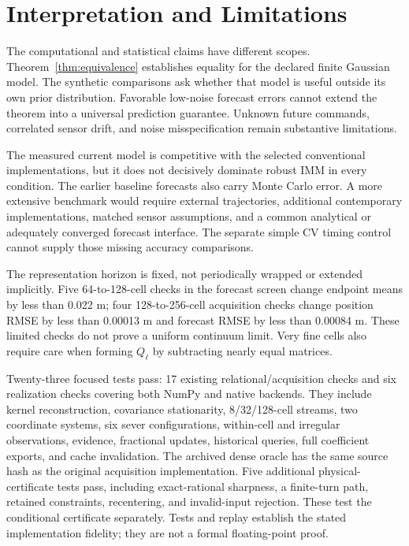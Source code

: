 \documentclass[journal]{IEEEtran}
\begin{document}
\section{Interpretation and Limitations}

The computational and statistical claims have different scopes.
Theorem~\ref{thm:equivalence} establishes equality for the declared
finite Gaussian model. The synthetic comparisons ask whether that model
is useful outside its own prior distribution. Favorable low-noise
forecast errors cannot extend the theorem into a universal prediction
guarantee. Unknown future commands, correlated sensor drift, and noise
misspecification remain substantive limitations.

The measured current model is competitive with the selected conventional
implementations, but it does not decisively dominate robust IMM in every
condition. The earlier baseline forecasts also carry Monte Carlo error.
A more extensive benchmark would require external trajectories,
additional contemporary implementations, matched sensor assumptions,
and a common analytical or adequately converged forecast interface.
The separate simple CV timing control cannot supply those missing
accuracy comparisons.

The representation horizon is fixed, not periodically wrapped or
extended implicitly. Five 64-to-128-cell checks in the forecast screen
change endpoint means by less than 0.022 m; four 128-to-256-cell
acquisition checks change position RMSE by less than 0.00013 m and
forecast RMSE by less than 0.00084 m. These limited checks do not prove
a uniform continuum limit. Very fine cells also require care when
forming $Q_\ell$ by subtracting nearly equal matrices.

Twenty-three focused tests pass: 17 existing relational/acquisition
checks and six realization checks covering both NumPy and native
backends. They include kernel reconstruction, covariance stationarity,
8/32/128-cell streams, two coordinate systems, six sever configurations,
within-cell and irregular observations, evidence, fractional updates,
historical queries, full coefficient exports, and cache invalidation.
The archived dense oracle has the same source hash as the original
acquisition implementation. Five additional physical-certificate tests pass, including exact-rational
sharpness, a finite-turn path, retained constraints, recentering, and
invalid-input rejection. These test the conditional certificate separately.
Tests and replay establish the stated
implementation fidelity; they are not a formal floating-point proof.
\end{document}
